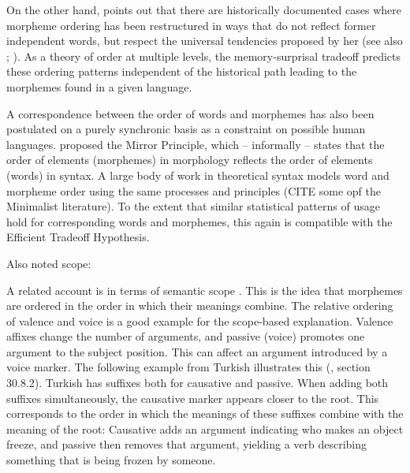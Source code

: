 \documentclass[11pt,letterpaper]{article}
\begin{document}
On the other hand, \citet{bybee-morphology-1985} points out that there are historically documented cases where morpheme ordering has been restructured in ways that do not reflect former independent words, but respect the universal tendencies proposed by her (see also \citet{mithun2000the, haspelmath1993the, mithun1995affixation}; \citet[Section 15]{rice2000morpheme}).
As a theory of order at multiple levels, the memory-surprisal tradeoff predicts these ordering patterns independent of the historical path leading to the morphemes found in a given language.

A correspondence between the order of words and morphemes has also been postulated on a purely synchronic basis as a constraint on possible human languages.
\cite{baker1985the} proposed the Mirror Principle, which -- informally -- states that the order of elements (morphemes) in morphology reflects the order of elements (words) in syntax.
A large body of work in theoretical syntax models word and morpheme order using the same processes and principles (CITE some opf the Minimalist literature).
To the extent that similar statistical patterns of usage hold for corresponding words and morphemes, this again is compatible with the Efficient Tradeoff Hypothesis.

Also noted scope: \citep{baker1988incorporation,foley1984functional,chierchia1990meaning,valin1992a}





A related account is in terms of semantic scope \citep{rice2000morpheme}.
This is the idea that morphemes are ordered in the order in which their meanings combine.
The relative ordering of valence and voice is a good example for the scope-based explanation.
Valence affixes change the number of arguments, and passive (voice) promotes one argument to the subject position.
This can affect an argument introduced by a voice marker.
The following example from Turkish illustrates this (\cite{schaaik2020turkish}, section 30.8.2).
Turkish has suffixes both for causative and passive.
When adding both suffixes simultaneously, the causative marker appears closer to the root.
This corresponds to the order in which the meanings of these suffixes combine with the meaning of the root:
Causative adds an argument indicating who makes an object freeze, and passive then removes that argument, yielding a verb describing something that is being frozen by someone.
\end{document}
